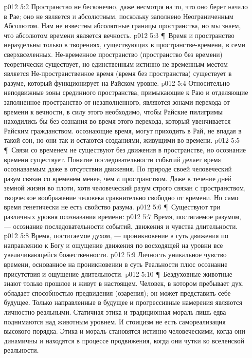 \vs p012 5:2 Пространство не бесконечно, даже несмотря на то, что оно берет начало в Рае; оно не является и абсолютным, поскольку заполнено Неограниченным Абсолютом. Нам не известны абсолютные границы пространства, но мы знаем, что абсолютом времени является вечность.
\vs p012 5:3 \P\ Время и пространство нераздельны только в творениях, существующих в пространстве\hyp{}времени, в семи сверхвселенных. Не\hyp{}временное пространство (пространство без времени) теоретически существует, но единственным истинно не\hyp{}временным местом является  Не\hyp{}пространственное время (время без пространства) существует в разуме, который функционирует на Райском уровне.
\vs p012 5:4 Относительно неподвижные зоны срединного пространства, примыкающие к Раю и отделяющие заполненное пространство от незаполненного, являются зонами перехода от времени к вечности, в силу этого необходимо, чтобы Райские пилигримы находились бы без сознания во время этого перехода, который увенчивается Райским гражданством.  осознающие время, могут приходить в Рай, не впадая в такой сон, но они так и остаются созданиями, живущими во времени.
\vs p012 5:5 \P\ Связи со временем не существуют без движения в пространстве, но осознание времени существует. Понятие последовательности событий делает время осознаваемым даже в отсутствии движения. По природе своей человеческий разум связан со временем менее, чем c пространством. Даже в течение дней земной жизни во плоти, хотя человеческий разум строго связан с пространством, творческое воображение человека сравнительно свободно от времени. Но само время генетически не есть свойство разума.
\vs p012 5:6 \P\ Существуют три различных уровня осознавания времени:
\vs p012 5:7 \bibnobreakspace Время, постигаемое разумом, --- осознание последовательности событий, движения и чувства длительности.
\vs p012 5:8 \bibnobreakspace Время, постигаемое духом, --- проникновение в суть движения по направлению к Богу и ощущение движения по восходящей на уровни все увеличивающейся божественности.
\vs p012 5:9 \bibnobreakspace Личность  уникальное чувство времени, основанное на проникновении в суть Реальности плюс осознание присутствия и ощущение длительности.
\vs p012 5:10 \P\ Бездуховные животные знают только прошлое и живут в настоящем. Человек, в котором пребывает дух, обладает способностью предвидения (озарения); он может представить себе будущее. Только направленные в будущее и прогрессивные намерения являются личностно реальными. Статичная этика и традиционная мораль лишь едва поднимаются над животным уровнем. И стоицизм не есть самореализация высокого порядка. Этика и мораль становятся истинно человеческими, когда они динамичны и находятся в процессе продвижения, когда они чутки ко вселенской реальности.
